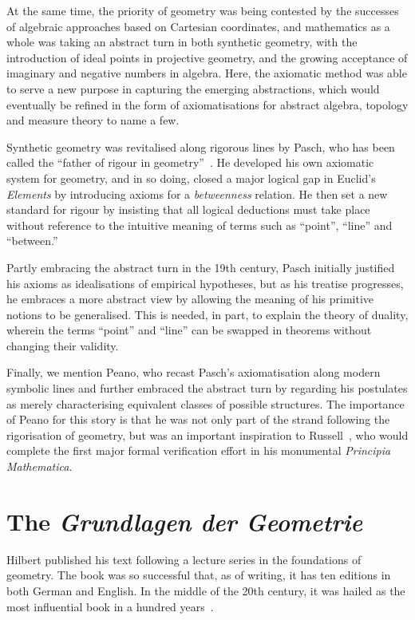 At the same time, the priority of geometry was being contested by the successes of algebraic approaches based on Cartesian coordinates, and mathematics as a whole was taking an abstract turn in both synthetic geometry, with the introduction of ideal points in projective geometry, and the growing acceptance of imaginary and negative numbers in algebra. Here, the axiomatic method was able to serve a new purpose in capturing the emerging abstractions, which would eventually be refined in the form of axiomatisations for abstract algebra, topology and measure theory to name a few.

Synthetic geometry was revitalised along rigorous lines by Pasch, who has been called the ``father of rigour in geometry''~\cite{PaschToPeano}. He developed his own axiomatic system for geometry, and in so doing, closed a major logical gap in Euclid's \emph{Elements} by introducing axioms for a \emph{betweenness} relation. He then set a new standard for rigour by insisting that all logical deductions must take place without reference to the intuitive meaning of terms such as ``point'', ``line'' and ``between.''

Partly embracing the abstract turn in the 19th century, Pasch initially justified his axioms as idealisations of empirical hypotheses, but as his treatise progresses, he embraces a more abstract view by allowing the meaning of his primitive notions to be generalised. This is needed, in part, to explain the theory of duality, wherein the terms ``point'' and ``line'' can be swapped in theorems without changing their validity.

Finally, we mention Peano, who recast Pasch's axiomatisation along modern symbolic lines and further embraced the abstract turn by regarding his postulates as merely characterising equivalent classes of possible structures. The importance of Peano for this story is that he was not only part of the strand following the rigorisation of geometry, but was an important inspiration to Russell~\cite{PrinciplesOfMathematics}, who would complete the first major formal verification effort in his monumental \emph{Principia Mathematica}.

\section{The \emph{Grundlagen der Geometrie}}
Hilbert published his text following a lecture series in the foundations of geometry. The book was so successful that, as of writing, it has ten editions in both German and English. In the middle of the 20th century, it was hailed as the most influential book in a hundred years~\cite{BirkhoffHilbertInfluence}.

